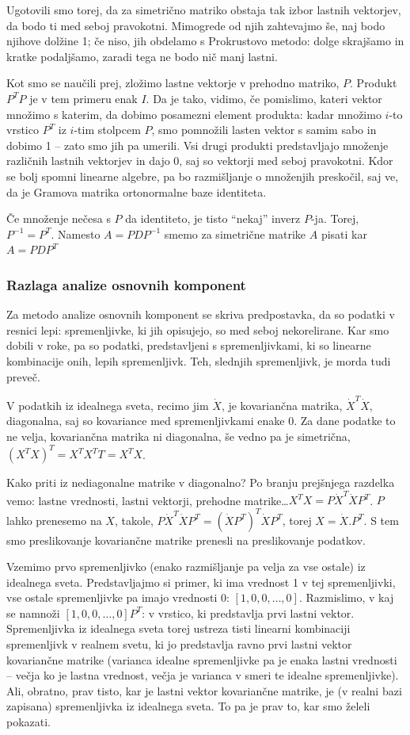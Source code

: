Ugotovili smo torej, da za simetrično matriko obstaja tak izbor lastnih vektorjev, da bodo ti med seboj pravokotni. Mimogrede od njih zahtevajmo še, naj bodo njihove dolžine 1; če niso, jih obdelamo s Prokrustovo metodo: dolge skrajšamo in kratke podaljšamo, zaradi tega ne bodo nič manj lastni.

Kot smo se naučili prej, zložimo lastne vektorje v prehodno matriko, $P$. Produkt $P^T P$ je v tem primeru enak $I$. Da je tako, vidimo, če pomislimo, kateri vektor množimo s katerim, da dobimo posamezni element produkta: kadar množimo $i$-to vrstico $P^T$ iz $i$-tim stolpcem $P$, smo pomnožili lasten vektor s samim sabo in dobimo 1 -- zato smo jih pa umerili. Vsi drugi produkti predstavljajo množenje različnih lastnih vektorjev in dajo 0, saj so vektorji med seboj pravokotni. Kdor se bolj spomni linearne algebre, pa bo razmišljanje o množenjih preskočil, saj ve, da je Gramova matrika ortonormalne baze identiteta.

Če množenje nečesa s $P$ da identiteto, je tisto ``nekaj'' inverz $P$-ja. Torej, $P^{-1}=P^T$. Namesto $A = P D P^{-1}$ smemo za simetrične matrike $A$ pisati kar $A = P D P^T$

\subsubsection{Razlaga analize osnovnih komponent}

Za metodo analize osnovnih komponent se skriva predpostavka, da so podatki v resnici lepi: spremenljivke, ki jih opisujejo, so med seboj nekorelirane. Kar smo dobili v roke, pa so podatki, predstavljeni s spremenljivkami, ki so linearne kombinacije onih, lepih spremenljivk. Teh, slednjih spremenljivk, je morda tudi preveč.

V podatkih iz idealnega sveta, recimo jim $\dot{X}$, je kovariančna matrika, $\dot{X}^T \dot{X}$, diagonalna, saj so kovariance med spremenljivkami enake 0. Za dane podatke to ne velja, kovariančna matrika ni diagonalna, še vedno pa je simetrična, $(X^T X)^T = X^T X^TT = X^T X$.

Kako priti iz nediagonalne matrike v diagonalno? Po branju prejšnjega razdelka vemo: lastne vrednosti, lastni vektorji, prehodne matrike\ldots $X^T X = P \dot{X}^T \dot{X} P^T$. $P$ lahko prenesemo na $X$, takole, $P \dot{X}^T \dot{X} P^T = (\dot{X} P^T)^T \dot{X} P^T$, torej $X = \dot{X}. P^T$. S tem smo preslikovanje kovariančne matrike prenesli na preslikovanje podatkov.

Vzemimo prvo spremenljivko (enako razmišljanje pa velja za vse ostale)  iz idealnega sveta. Predstavljajmo si primer, ki ima vrednost 1 v tej spremenljivki, vse ostale spremenljivke pa imajo vrednosti 0: $[1, 0, 0,\ldots, 0]$. Razmislimo, v kaj se namnoži $[1, 0, 0, \ldots, 0] P^T$: v vrstico, ki predstavlja prvi lastni vektor. Spremenljivka iz idealnega sveta torej ustreza tisti linearni kombinaciji spremenljivk v realnem svetu, ki jo predstavlja ravno prvi lastni vektor kovariančne matrike (varianca idealne spremenljivke pa je enaka lastni vrednosti -- večja ko je lastna vrednost, večja je varianca v smeri te idealne spremenljivke). Ali, obratno, prav tisto, kar je lastni vektor kovariančne matrike, je (v realni bazi zapisana) spremenljivka iz idealnega sveta. To pa je prav to, kar smo želeli pokazati.

